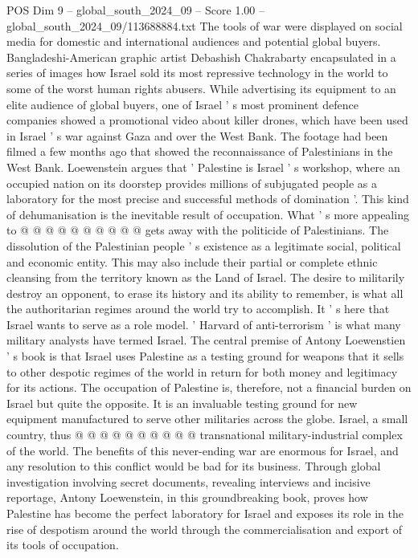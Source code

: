 \begin{textsample}{POS Dim 9 – global\_south\_2024\_09 – Score 1.00 – global\_south\_2024\_09/113688884.txt}
The tools of war were displayed on social media for domestic and international audiences and potential global buyers.
Bangladeshi-American graphic artist Debashish Chakrabarty encapsulated in a series of images how Israel sold its most repressive technology in the world to some of the worst human rights abusers.
While advertising its equipment to an elite audience of global buyers, one of Israel ' s most prominent defence companies showed a promotional video about killer drones, which have been used in Israel ' s war against Gaza and over the West Bank.
The footage had been filmed a few months ago that showed the reconnaissance of Palestinians in the West Bank.
Loewenstein argues that ' Palestine is Israel ' s workshop, where an occupied nation on its doorstep provides millions of subjugated people as a laboratory for the most precise and successful methods of domination '.
This kind of dehumanisation is the inevitable result of occupation.
What ' s more appealing to @ @ @ @ @ @ @ @ @ @ gets away with the politicide of Palestinians.
The dissolution of the Palestinian people ' s existence as a legitimate social, political and economic entity.
This may also include their partial or complete ethnic cleansing from the territory known as the Land of Israel.
The desire to militarily destroy an opponent, to erase its history and its ability to remember, is what all the authoritarian regimes around the world try to accomplish.
It ' s here that Israel wants to serve as a role model. ' Harvard of anti-terrorism ' is what many military analysts have termed Israel.
The central premise of Antony Loewenstien ' s book is that Israel uses Palestine as a testing ground for weapons that it sells to other despotic regimes of the world in return for both money and legitimacy for its actions.
The occupation of Palestine is, therefore, not a financial burden on Israel but quite the opposite.
It is an invaluable testing ground for new equipment manufactured to serve other militaries across the globe.
Israel, a small country, thus @ @ @ @ @ @ @ @ @ @ transnational military-industrial complex of the world.
The benefits of this never-ending war are enormous for Israel, and any resolution to this conflict would be bad for its business.
Through global investigation involving secret documents, revealing interviews and incisive reportage, Antony Loewenstein, in this groundbreaking book, proves how Palestine has become the perfect laboratory for Israel and exposes its role in the rise of despotism around the world through the commercialisation and export of its tools of occupation.

\end{textsample}
